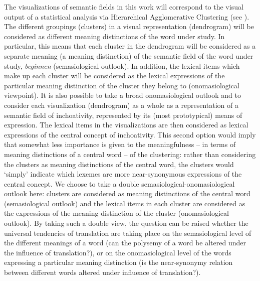 The visualizations of semantic fields in this work will correspond to the visual output of a statistical analysis via Hierarchical Agglomerative Clustering (see ). The different groupings (clusters) in a visual representation (dendrogram) will be considered as different meaning distinctions of the word under study. In particular, this means that each cluster in the dendrogram will be considered as a separate meaning (a meaning distinction) of the semantic field of the word under study, \textit{beginnen} (semasiological outlook). In addition, the lexical items which make up each cluster will be considered as the lexical expressions of the particular meaning distinction of the cluster they belong to (onomasiological viewpoint). It is also possible to take a broad onomasiological outlook and to consider each visualization (dendrogram) as a whole as a representation of a semantic field of inchoativity, represented by its (most prototypical) means of expression. The lexical items in the visualizations are then considered as lexical expressions of the central concept of inchoativity. This second option would imply that somewhat less importance is given to the meaningfulness – in terms of meaning distinctions of a central word – of the clustering: rather than considering the clusters as meaning distinctions of the central word, the clusters would ‘simply’ indicate which lexemes are more near-synonymous expressions of the central concept. We choose to take a double semasiological-onomasiological outlook here: clusters are considered as meaning distinctions of the central word (semasiological outlook) and the lexical items in each cluster are considered as the expressions of the meaning distinction of the cluster (onomasiological outlook). By taking such a double view, the question can be raised whether the universal tendencies of translation are taking place on the semasiological level of the different meanings of a word (can the polysemy of a word be altered under the influence of translation?), or on the onomasiological level of the words expressing a particular meaning distinction (is the near-synonymy relation between different words altered under influence of translation?).

